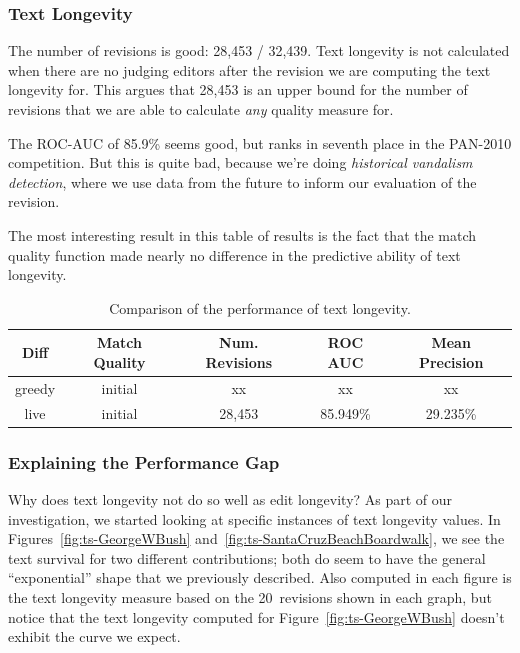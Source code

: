 \subsubsection{Text Longevity}

The number of revisions is good: 28,453 / 32,439.
Text longevity is not calculated when there are no
judging editors after the revision we are computing
the text longevity for.
This argues that 28,453 is an upper bound for the number
of revisions that we are able to calculate \textit{any}
quality measure for.

The ROC-AUC of 85.9\% seems good, but ranks in seventh place
in the PAN-2010 competition.
But this is quite bad, because we're doing \textit{historical
vandalism detection}, where we use data from the future to
inform our evaluation of the revision.

The most interesting result in this table of results
is the fact that the match quality function made
nearly no difference in the predictive ability of
text longevity.


\begin{table}[tbph]
\begin{center}
\begin{tabular}{|c|c||c|c|c|}
\hline
Diff & Match Quality & Num. Revisions & ROC AUC & Mean Precision \\
\hline
\hline
greedy & initial & xx & xx & xx \\
live & initial & 28,453 & 85.949\% & 29.235\% \\
\hline
\end{tabular}
\end{center}
\caption{Comparison of the performance of text longevity.
} 
\end{table}

\subsubsection{Explaining the Performance Gap}

Why does text longevity not do so well as edit longevity?
As part of our investigation, we started looking at specific
instances of text longevity values.
In Figures~\ref{fig:ts-GeorgeWBush} and~\ref{fig:ts-SantaCruzBeachBoardwalk},
we see the text survival for two different contributions;
both do seem to have the general ``exponential'' shape
that we previously described.
Also computed in each figure is the text longevity measure based on
the 20~revisions shown in each graph, but notice that the text
longevity computed for
Figure~\ref{fig:ts-GeorgeWBush} doesn't exhibit the curve we expect.

